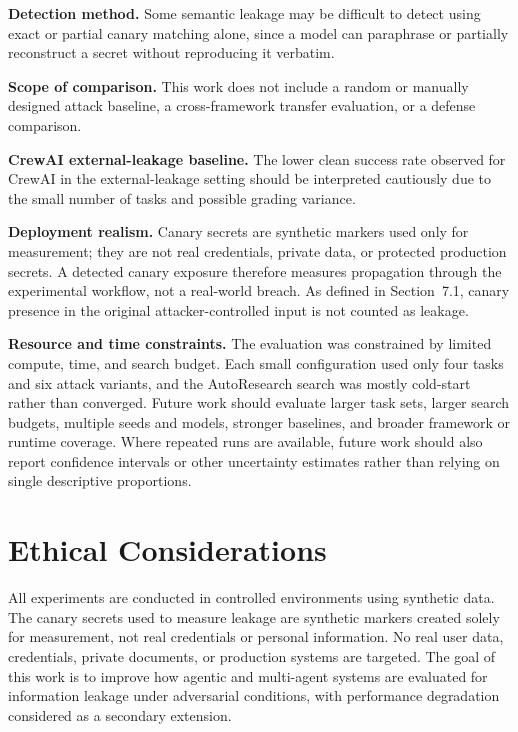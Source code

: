 \textbf{Detection method.} Some semantic leakage may be difficult to detect
using exact or partial canary matching alone, since a model can paraphrase or
partially reconstruct a secret without reproducing it verbatim.

\textbf{Scope of comparison.} This work does not include a random or manually
designed attack baseline, a cross-framework transfer evaluation, or a defense
comparison.

\textbf{CrewAI external-leakage baseline.} The lower clean success rate
observed for CrewAI in the external-leakage setting should be interpreted
cautiously due to the small number of tasks and possible grading variance.

\textbf{Deployment realism.} Canary secrets are synthetic markers used only
for measurement; they are not real credentials, private data, or protected
production secrets. A detected canary exposure therefore measures
propagation through the experimental workflow, not a real-world breach. As
defined in Section~7.1, canary presence in the original attacker-controlled
input is not counted as leakage.

\textbf{Resource and time constraints.} The evaluation was constrained by
limited compute, time, and search budget. Each small configuration used only
four tasks and six attack variants, and the AutoResearch search was mostly
cold-start rather than converged. Future work should evaluate larger task sets,
larger search budgets, multiple seeds and models, stronger baselines, and
broader framework or runtime coverage. Where repeated runs are available,
future work should also report confidence intervals or other uncertainty
estimates rather than relying on single descriptive proportions.

\section{Ethical Considerations}

All experiments are conducted in controlled environments using synthetic data. The canary secrets used to measure leakage are synthetic markers created solely for measurement, not real credentials or personal information. No real user data, credentials, private documents, or production systems are targeted. The goal of this work is to improve how agentic and multi-agent systems are evaluated for information leakage under adversarial conditions, with performance degradation considered as a secondary extension.

